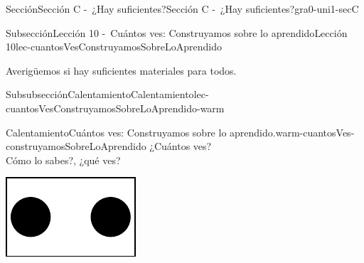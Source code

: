 \documentclass[twoside,10pt,]{article}
\begin{document}
%
%
\typeout{************************************************}
\typeout{************************************************}
%
\begin{sectionptx}{Sección}{Sección C -~¿Hay suficientes?}{}{Sección C -~¿Hay suficientes?}{}{}{gra0-uni1-secC}
%
%
\typeout{************************************************}
\typeout{************************************************}
%
\begin{subsectionptx}{Subsección}{Lección 10 -~Cuántos ves: Construyamos sobre lo aprendido}{}{Lección 10}{}{}{lec-cuantosVesConstruyamosSobreLoAprendido}
\begin{introduction}{}%
Averigüemos si hay suficientes materiales para todos.%
\end{introduction}%
%
%
\typeout{************************************************}
\typeout{************************************************}
%
\begin{subsubsectionptx}{Subsubsección}{Calentamiento}{}{Calentamiento}{}{}{lec-cuantosVesConstruyamosSobreLoAprendido-warm}
\begin{exploration}{Calentamiento}{Cuántos ves: Construyamos sobre lo aprendido.}{warm-cuantosVes-construyamosSobreLoAprendido}%
¿Cuántos ves?\\
 Cómo lo sabes?, ¿qué ves?%
\begin{sidebyside}{2}{0}{0}{0}%
\begin{sbspanel}{0.5}%
\includegraphics[width=\linewidth]{external/svg-source/tikz-file-136323.pdf}
\end{sbspanel}%
\begin{sbspanel}{0.5}%

\end{sbspanel}
\end{sidebyside}
\end{exploration}
\end{subsubsectionptx}
\end{subsectionptx}
\end{sectionptx}
\end{document}

